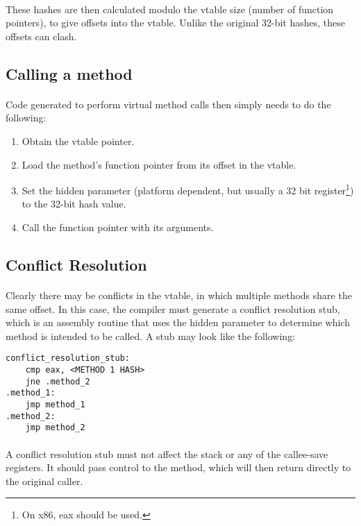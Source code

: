 \documentclass[12pt,twoside,notitlepage]{report}
\begin{document}
\paragraph{}
These hashes are then calculated modulo the vtable size (number of function pointers), to give offsets into the vtable. Unlike the original 32-bit hashes, these offsets can clash.

\subsection{Calling a method}

\paragraph{}
Code generated to perform virtual method calls then simply needs to do the following:

\begin{enumerate}
\item Obtain the vtable pointer.
\item Load the method's function pointer from its offset in the vtable.
\item Set the hidden parameter (platform dependent, but usually a 32 bit register\footnote{On x86, eax should be used.}) to the 32-bit hash value.
\item Call the function pointer with its arguments.
\end{enumerate}

\subsection{Conflict Resolution}

\paragraph{}
Clearly there may be conflicts in the vtable, in which multiple methods share the same offset. In this case, the compiler must generate a conflict resolution stub, which is an assembly routine that uses the hidden parameter to determine which method is intended to be called. A stub may look like the following:

\begin{lstlisting}
conflict_resolution_stub:
	cmp eax, <METHOD 1 HASH>
	jne .method_2
.method_1:
	jmp method_1
.method_2:
	jmp method_2
\end{lstlisting}

\paragraph{}
A conflict resolution stub must not affect the stack or any of the callee-save registers. It should pass control to the method, which will then return directly to the original caller.
\end{document}
